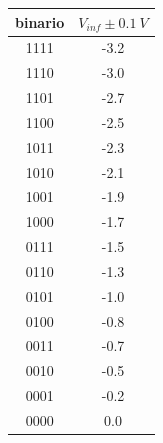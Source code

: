 \documentclass[journal]{IEEEtran}
\begin{document}
\begin{appendices}
\begin{tabular}{cc}
binario & $V_{inf}  \pm 0.1 \ V$ \\ \hline
1111    & -3.2                  \\
1110    & -3.0                  \\
1101    & -2.7                  \\
1100    & -2.5                  \\
1011    & -2.3                  \\
1010    & -2.1                  \\
1001    & -1.9                  \\
1000    & -1.7                  \\
0111    & -1.5                  \\
0110    & -1.3                  \\
0101    & -1.0                  \\
0100    & -0.8                  \\
0011    & -0.7                  \\
0010    & -0.5                  \\
0001    & -0.2                  \\
0000    & 0.0
\vspace{5 mm}
\label{tab:calibrazione_adc}
\end{tabular}


\end{appendices}


\clearpage
\newpage

\tableofcontents %

\newpage

\printbibliography %
\end{document}
